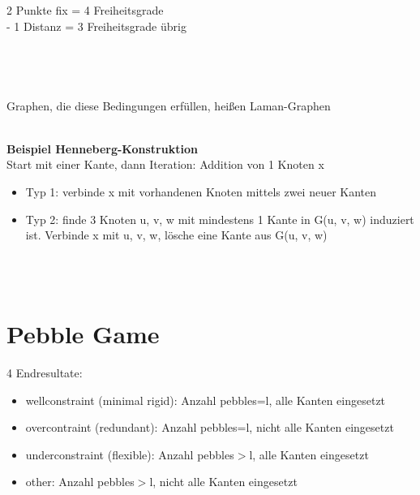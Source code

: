 \documentclass[12pt,a4paper]{article}
\begin{document}
2 Punkte fix = 4 Freiheitsgrade\\
- 1 Distanz = 3 Freiheitsgrade übrig\\

\\\\
\\\\
Graphen, die diese Bedingungen erfüllen, heißen Laman-Graphen
\\\\
\parbox{\linewidth}{\textbf{Beispiel Henneberg-Konstruktion}\\
Start mit einer Kante, dann Iteration: Addition von 1 Knoten x
\begin{itemize}
	\item Typ 1: verbinde x mit  vorhandenen Knoten mittels zwei neuer Kanten
	\item Typ 2: finde 3 Knoten u, v, w mit mindestens 1 Kante in G(u, v, w) induziert ist. Verbinde x mit u, v, w, lösche eine Kante aus G(u, v, w)
\end{itemize}
}
\\\\

\section{Pebble Game}
4 Endresultate:
\begin{itemize}
	\item wellconstraint (minimal rigid): Anzahl pebbles=l, alle Kanten eingesetzt
	\item overcontraint (redundant): Anzahl pebbles=l, nicht alle Kanten eingesetzt
	\item underconstraint (flexible): Anzahl pebbles$>$l, alle Kanten eingesetzt
	\item other: Anzahl pebbles$>$l, nicht alle Kanten eingesetzt
\end{itemize}
\end{document}
